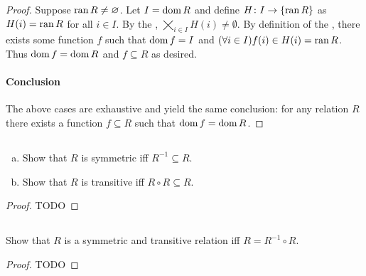 \documentclass{report}
\begin{document}
\begin{proof}
      Suppose $\mathop{\text{ran}}{R} \neq \varnothing$.
      Let $I = \mathop{\text{dom}}{R}$ and define $H \colon I \rightarrow \{\mathop{\text{ran}}{R}\}$ as
        $H(i) = \mathop{\text{ran}}{R}$ for all $i \in I$.
      By the ,
        $\bigtimes_{i \in I} H(i) \neq \emptyset$.
      By definition of the , there exists some
        function $f$ such that $\mathop{\text{dom}}{f} = I$ and
        $(\forall i \in I) f(i) \in H(i) = \mathop{\text{ran}}{R}$.
      Thus $\mathop{\text{dom}}{f} = \mathop{\text{dom}}{R}$ and $f \subseteq R$ as desired.

    \paragraph{Conclusion}%

      The above cases are exhaustive and yield the same conclusion: for any
        relation $R$ there exists a function $f \subseteq R$ such that
        $\mathop{\text{dom}}{f} = \mathop{\text{dom}}{R}$.

\end{proof}

\subsection{}%
\label{sub:exercise-3.32}

\begin{enumerate}[(a)]
  \item Show that $R$ is symmetric iff $R^{-1} \subseteq R$.
  \item Show that $R$ is transitive iff $R \circ R \subseteq R$.
\end{enumerate}

\begin{proof}

  TODO

\end{proof}

\subsection{}%
\label{sub:exercise-3.33}

Show that $R$ is a symmetric and transitive relation iff $R = R^{-1} \circ R$.

\begin{proof}

  TODO

\end{proof}

\subsection{}%
\label{sub:exercise-3.34}
\end{document}
